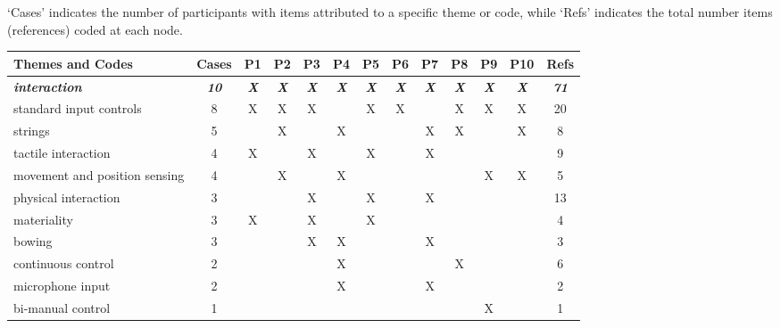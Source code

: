 \documentclass[letterpaper, 12pt]{article}
\begin{document}
\begin{spacing}{1.1}
    \footnotesize
    \noindent`Cases' indicates the number of participants with items attributed to a specific theme or code, while `Refs' indicates the total number items (references) coded at each node.
    \begin{longtable}{L{5.3cm}cccccccccccc}
        \hline
        \textbf{Themes and Codes} & \textbf{Cases} & \textbf{P1} & \textbf{P2} & \textbf{P3} & \textbf{P4} & \textbf{P5} & \textbf{P6} & \textbf{P7} & \textbf{P8} & \textbf{P9} & \textbf{P10} & \textbf{Refs} \\ 
        \hline
        \emph{\textbf{interaction}} & \emph{\textbf{10}} & \emph{\textbf{X}} & \emph{\textbf{X}} & \emph{\textbf{X}} & \emph{\textbf{X}} & \emph{\textbf{X}} & \emph{\textbf{X}} & \emph{\textbf{X}} & \emph{\textbf{X}} & \emph{\textbf{X}} & \emph{\textbf{X}} & \emph{\textbf{71}} \\
        standard input controls          & 8  & X & X & X &   & X & X &   & X & X & X & 20 \\
        strings                          & 5  &   & X &   & X &   &   & X & X &   & X & 8  \\
        tactile interaction              & 4  & X &   & X &   & X &   & X &   &   &   & 9  \\
        movement and position sensing    & 4  &   & X &   & X &   &   &   &   & X & X & 5  \\
        physical interaction             & 3  &   &   & X &   & X &   & X &   &   &   & 13 \\
        materiality                      & 3  & X &   & X &   & X &   &   &   &   &   & 4  \\
        bowing                           & 3  &   &   & X & X &   &   & X &   &   &   & 3  \\
        continuous control               & 2  &   &   &   & X &   &   &   & X &   &   & 6  \\
        microphone input                 & 2  &   &   &   & X &   &   & X &   &   &   & 2  \\
        bi-manual control                & 1  &   &   &   &   &   &   &   &   & X &   & 1  \\
        \hline


\end{longtable}
\end{spacing}
\end{document}

